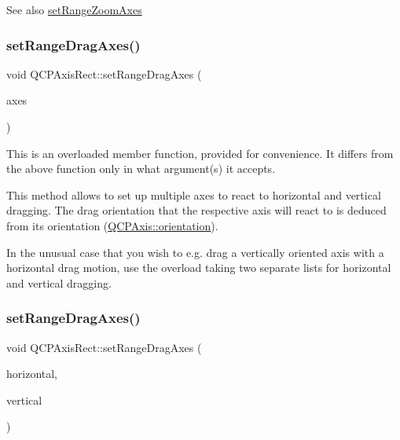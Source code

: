 \begin{DoxySeeAlso}{See also}
\mbox{\hyperlink{class_q_c_p_axis_rect_a9442cca2aa358405f39a64d51eca13d2}{set\+Range\+Zoom\+Axes}} 
\end{DoxySeeAlso}
\mbox{\label{class_q_c_p_axis_rect_af0fbc510147a2a54b9c8cd296e6df8ac}} 
\subsubsection{\texorpdfstring{setRangeDragAxes()}{setRangeDragAxes()}\hspace{0.1cm}{\footnotesize\ttfamily [2/3]}}
{\footnotesize\ttfamily void Q\+C\+P\+Axis\+Rect\+::set\+Range\+Drag\+Axes (\begin{DoxyParamCaption}\item[{Q\+List$<$ \mbox{\hyperlink{class_q_c_p_axis}{Q\+C\+P\+Axis}} $\ast$ $>$}]{axes }\end{DoxyParamCaption})}

This is an overloaded member function, provided for convenience. It differs from the above function only in what argument(s) it accepts.

This method allows to set up multiple axes to react to horizontal and vertical dragging. The drag orientation that the respective axis will react to is deduced from its orientation (\mbox{\hyperlink{class_q_c_p_axis_ab988ef4538e2655bb77bd138189cd42e}{Q\+C\+P\+Axis\+::orientation}}).

In the unusual case that you wish to e.\+g. drag a vertically oriented axis with a horizontal drag motion, use the overload taking two separate lists for horizontal and vertical dragging. \mbox{\label{class_q_c_p_axis_rect_a8366903edcb3bb703a8b0be783a85746}} 
\subsubsection{\texorpdfstring{setRangeDragAxes()}{setRangeDragAxes()}\hspace{0.1cm}{\footnotesize\ttfamily [3/3]}}
{\footnotesize\ttfamily void Q\+C\+P\+Axis\+Rect\+::set\+Range\+Drag\+Axes (\begin{DoxyParamCaption}\item[{Q\+List$<$ \mbox{\hyperlink{class_q_c_p_axis}{Q\+C\+P\+Axis}} $\ast$ $>$}]{horizontal,  }\item[{Q\+List$<$ \mbox{\hyperlink{class_q_c_p_axis}{Q\+C\+P\+Axis}} $\ast$ $>$}]{vertical }\end{DoxyParamCaption})}

